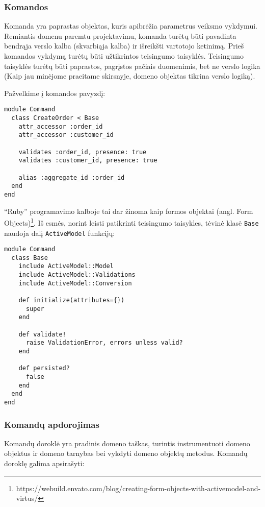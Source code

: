 \subsubsection{Komandos}

Komanda yra paprastas objektas, kuris apibrėžia parametrus veiksmo vykdymui. Remiantis domenu paremtu projektavimu, komanda turėtų būti pavadinta bendrąja verslo kalba (skvarbiąja kalba) ir išreikšti vartotojo ketinimą. Prieš komandos vykdymą turėtų būti užtikrintos teisingumo taisyklės. Teisingumo taisyklės turėtų būti paprastos, pagrįstos pačiais duomenimis, bet ne verslo logika (Kaip jau minėjome praeitame skirsnyje, domeno objektas tikrina verslo logiką).

Pažvelkime į komandos pavyzdį:

\begin{lstlisting}
module Command
  class CreateOrder < Base
    attr_accessor :order_id
    attr_accessor :customer_id

    validates :order_id, presence: true
    validates :customer_id, presence: true

    alias :aggregate_id :order_id
  end
end
\end{lstlisting}

``Ruby'' programavimo kalboje tai dar žinoma kaip formos objektai (angl. Form Objects)\footnote{https://webuild.envato.com/blog/creating-form-objects-with-activemodel-and-virtus/}. Iš esmės, norint leisti patikrinti teisingumo taisykles, tėvinė klasė \lstinline|Base| naudoja dalį \lstinline|ActiveModel| funkcijų:

\begin{lstlisting}
module Command
  class Base
    include ActiveModel::Model
    include ActiveModel::Validations
    include ActiveModel::Conversion

    def initialize(attributes={})
      super
    end

    def validate!
      raise ValidationError, errors unless valid?
    end

    def persisted?
      false
    end
  end
end
\end{lstlisting}

\subsubsection{Komandų apdorojimas}

Komandų doroklė yra pradinis domeno taškas, turintis instrumentuoti domeno objektus ir domeno tarnybas bei vykdyti domeno objektų metodus. Komandų doroklę galima apsirašyti:

